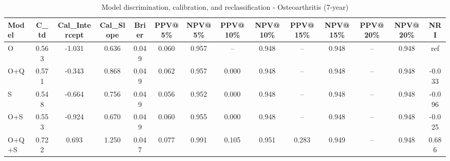 \begin{table}[htbp]
\centering
\small
\caption{Model discrimination, calibration, and reclassification - Osteoarthritis (7-year)}
\label{tab:perf_osteoarthritis_7y}
\begin{tabular}{lccccccccccccc}
\toprule
Model & C\_td & Cal\_Intercept & Cal\_Slope & Brier & PPV@5\% & NPV@5\% & PPV@10\% & NPV@10\% & PPV@15\% & NPV@15\% & PPV@20\% & NPV@20\% & NRI \\
\midrule
O & 0.563 & -1.031 & 0.636 & 0.049 & 0.060 & 0.957 & -- & 0.948 & -- & 0.948 & -- & 0.948 & ref \\
O+Q & 0.571 & -0.343 & 0.868 & 0.049 & 0.062 & 0.957 & 0.000 & 0.948 & -- & 0.948 & -- & 0.948 & -0.033 \\
S & 0.548 & -0.664 & 0.756 & 0.049 & 0.056 & 0.952 & 0.000 & 0.948 & -- & 0.948 & -- & 0.948 & -0.096 \\
O+S & 0.553 & -0.924 & 0.670 & 0.049 & 0.060 & 0.955 & 0.000 & 0.948 & -- & 0.948 & -- & 0.948 & -0.025 \\
O+Q+S & 0.722 & 0.693 & 1.250 & 0.047 & 0.077 & 0.991 & 0.105 & 0.951 & 0.283 & 0.949 & -- & 0.948 & 0.686 \\
\bottomrule
\end{tabular}
\end{table}